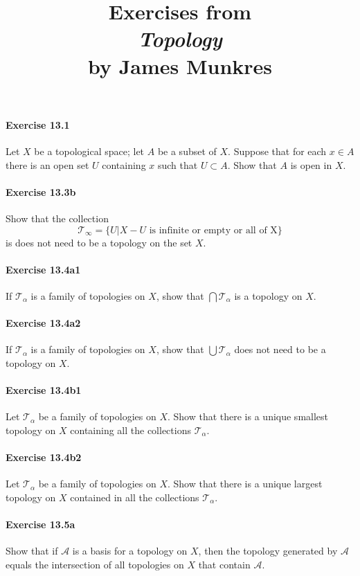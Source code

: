 \documentclass{article}
\title{\textbf{
Exercises from \\
\textit{Topology} \\
by James Munkres
}}
\date{}
\begin{document}
\maketitle


\paragraph{Exercise 13.1} Let $X$ be a topological space; let $A$ be a subset of $X$. Suppose that for each $x \in A$ there is an open set $U$ containing $x$ such that $U \subset A$. Show that $A$ is open in $X$.


\paragraph{Exercise 13.3b} Show that the collection $$\mathcal{T}_\infty = \{U | X - U \text{ is infinite or empty or all of X}\}$$ is does not need to be a topology on the set $X$.


\paragraph{Exercise 13.4a1} If $\mathcal{T}_\alpha$ is a family of topologies on $X$, show that $\bigcap \mathcal{T}_\alpha$ is a topology on $X$.


\paragraph{Exercise 13.4a2} If $\mathcal{T}_\alpha$ is a family of topologies on $X$, show that $\bigcup \mathcal{T}_\alpha$ does not need to be a topology on $X$.


\paragraph{Exercise 13.4b1} Let $\mathcal{T}_\alpha$ be a family of topologies on $X$. Show that there is a unique smallest topology on $X$ containing all the collections $\mathcal{T}_\alpha$.


\paragraph{Exercise 13.4b2} Let $\mathcal{T}_\alpha$ be a family of topologies on $X$. Show that there is a unique largest topology on $X$ contained in all the collections $\mathcal{T}_\alpha$.


\paragraph{Exercise 13.5a} Show that if $\mathcal{A}$ is a basis for a topology on $X$, then the topology generated by $\mathcal{A}$ equals the intersection of all topologies on $X$ that contain $\mathcal{A}$.
\end{document}
